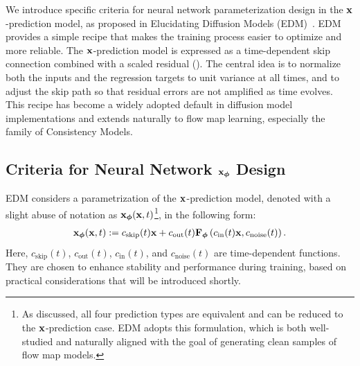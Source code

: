 We introduce specific criteria for neural network parameterization design in
the ${\mathbf{x}}$-prediction model, as proposed in Elucidating Diffusion Models
(EDM)~\citep{karras2022elucidating}. EDM provides a simple 
recipe that makes the training process easier to optimize and more reliable.
The ${\mathbf{x}}$-prediction model is expressed as a time-dependent skip connection combined with a
scaled residual (). The central idea is to normalize both the inputs and the regression targets to
unit variance at all times, and to adjust the skip path so that residual errors
are not amplified as time evolves.
 This recipe
has become a widely adopted default in diffusion model implementations and
extends naturally to flow map learning, especially the family of Consistency
Models. 




\subsection{Criteria for Neural Network ${\mathbf{x}}_{\bm{\phi}}$ Design}\label{subsec:D-design-edm}

EDM considers a parametrization of the ${\mathbf{x}}$-prediction model, denoted with a slight abuse of notation as ${\mathbf{x}}_{\bm{\phi}}({\mathbf{x}}, t)$\footnote{As discussed, all four prediction types are equivalent and can be reduced to the ${\mathbf{x}}$-prediction case. EDM adopts this formulation, which is both well-studied and naturally aligned with the goal of generating clean samples of flow map models.}, in the following form: 
\begin{align}\label{eq:D-parametrization}
    {\mathbf{x}}_{\bm{\phi}}({\mathbf{x}}, t) := c_{\mathrm{skip}}(t) {\mathbf{x}} + c_{\mathrm{out}}(t) {\mathbf{F}}_{\bm{\phi}}\left(c_{\mathrm{in}}(t) {\mathbf{x}}, c_{\mathrm{noise}}(t)\right).
\end{align}
Here, $c_{\mathrm{skip}}(t)$, $c_{\mathrm{out}}(t)$, $c_{\mathrm{in}}(t)$, and $c_{\mathrm{noise}}(t)$ are time-dependent functions.  
They are chosen to enhance stability and performance during training, based on practical considerations that will be introduced shortly.



